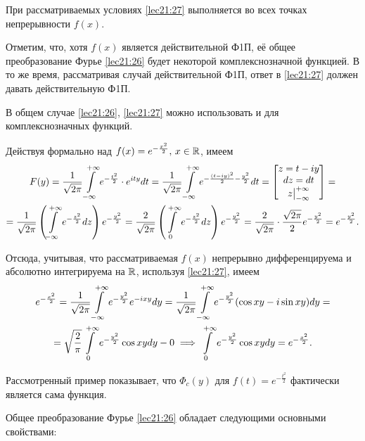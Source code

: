 \documentclass[../../main.tex]{subfiles}
\begin{document}
При  рассматриваемых условиях \eqref{lec21:27} выполняется во всех точках 
непрерывности $f(x)$.

Отметим, что, хотя $f(x)$ является действительной Ф1П, её общее преобразование 
Фурье \eqref{lec21:26} будет некоторой комплекснозначной функцией. В то же 
время, рассматривая случай действительной Ф1П, ответ в \eqref{lec21:27} 
должен давать действительную Ф1П.

В общем случае \eqref{lec21:26}, \eqref{lec21:27} можно использовать и для  
комплекснозначных функций.

\begin{example}
  Действуя формально над  $f(x) = e^{-\frac{x^2}2}, \, x \in \mathbb{R}$, имеем
  \begin{multline*}
    F(y) = \frac1{\sqrt{2\pi}}\int\limits_{-\infty}^{+\infty} e^{-\frac{t^2}2} \cdot e^{ity} dt = 
    \frac1{\sqrt{2\pi}}\int\limits_{-\infty}^{+\infty} e^{-\frac{(t-iy)^2}2-\frac{y^2}2} dt =
    \begin{bmatrix}
      z = t-iy \\
      dz = dt \\
      z \big|_{-\infty}^{+\infty}
    \end{bmatrix} =\\ =
    \frac1{\sqrt{2\pi}} \left(\int\limits_{-\infty}^{+\infty} e^{-\frac{z^2}2} dz\right)
    e^{-\frac{y^2}2} = \frac{2}{\sqrt{2\pi}}\left(\int\limits_{0}^{+\infty} 
    e^{-\frac{z^2}2} dz\right) e^{-\frac{y^2}2} = \frac{2}{\sqrt{2\pi}}\cdot
    \frac{\sqrt{2\pi}}{2}e^{-\frac{y^2}2} =  e^{-\frac{y^2}2}.
  \end{multline*}
  
  Отсюда, учитывая, что рассматриваемая $f(x)$ непрерывно дифференцируема и 
  абсолютно интегрируема на $\mathbb{R}$, используя \eqref{lec21:27}, имеем
  \begin{multline*}
    e^{-\frac{x^2}2} = \frac{1}{\sqrt{2\pi}}\int\limits_{-\infty}^{+\infty} e^{-\frac{y^2}2}e^{-ixy} dy 
    =\frac{1}{\sqrt{2\pi}}\int\limits_{-\infty}^{+\infty} e^{-\frac{y^2}2}(\cos xy - i\sin xy) dy =\\= 
    \sqrt{\frac{2}{\pi}}\int\limits_{0}^{+\infty} e^{-\frac{y^2}2}\cos xy dy - 
    0 \implies \int\limits_{0}^{+\infty} e^{-\frac{y^2}2}\cos xy dy = 
    e^{-\frac{x^2}2}.
  \end{multline*}
\end{example}

Рассмотренный пример показывает, что $\Phi_c(y)$ для $f(t) = e^{-\frac{t^2}2}$ 
фактически является сама функция.

Общее преобразование Фурье \eqref{lec21:26} обладает следующими основными
свойствами:
\end{document}
